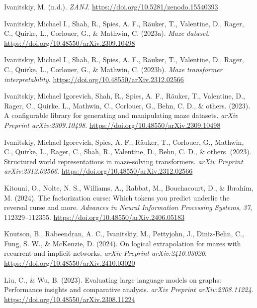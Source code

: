 \documentclass[10pt,a4paper,onecolumn]{article}
\newlength{\cslhangindent}
\newenvironment{CSLReferences}[2] %
 {\begin{list}{}{%
  \setlength{\itemindent}{0pt}
  \setlength{\leftmargin}{0pt}
  \setlength{\parsep}{0pt}
  \ifodd #1
   \setlength{\leftmargin}{\cslhangindent}
   \setlength{\itemindent}{-1\cslhangindent}
  \fi
  \setlength{\itemsep}{#2\baselineskip}}}
 {\end{list}}
\begin{document}
\begin{CSLReferences}{1}{0.5}
\leavevmode{}%
Ivanitskiy, M. (n.d.). \emph{ZANJ}.
\url{https://doi.org/10.5281/zenodo.15540393}

\leavevmode{}%
Ivanitskiy, Michael I., Shah, R., Spies, A. F., Räuker, T., Valentine,
D., Rager, C., Quirke, L., Corlouer, G., \& Mathwin, C. (2023a).
\emph{Maze dataset}. \url{https://doi.org/10.48550/arXiv.2309.10498}

\leavevmode{}%
Ivanitskiy, Michael I., Shah, R., Spies, A. F., Räuker, T., Valentine,
D., Rager, C., Quirke, L., Corlouer, G., \& Mathwin, C. (2023b).
\emph{Maze transformer interpretability}.
\url{https://doi.org/10.48550/arXiv.2312.02566}

\leavevmode{}%
Ivanitskiy, Michael Igorevich, Shah, R., Spies, A. F., Räuker, T.,
Valentine, D., Rager, C., Quirke, L., Mathwin, C., Corlouer, G., Behn,
C. D., \& others. (2023). A configurable library for generating and
manipulating maze datasets. \emph{arXiv Preprint arXiv:2309.10498}.
\url{https://doi.org/10.48550/arXiv.2309.10498}

\leavevmode{}%
Ivanitskiy, Michael Igorevich, Spies, A. F., Räuker, T., Corlouer, G.,
Mathwin, C., Quirke, L., Rager, C., Shah, R., Valentine, D., Behn, C.
D., \& others. (2023). Structured world representations in maze-solving
transformers. \emph{arXiv Preprint arXiv:2312.02566}.
\url{https://doi.org/10.48550/arXiv.2312.02566}

\leavevmode{}%
Kitouni, O., Nolte, N. S., Williams, A., Rabbat, M., Bouchacourt, D., \&
Ibrahim, M. (2024). The factorization curse: Which tokens you predict
underlie the reversal curse and more. \emph{Advances in Neural
Information Processing Systems}, \emph{37}, 112329--112355.
\url{https://doi.org/10.48550/arXiv.2406.05183}

\leavevmode{}%
Knutson, B., Rabeendran, A. C., Ivanitskiy, M., Pettyjohn, J.,
Diniz-Behn, C., Fung, S. W., \& McKenzie, D. (2024). On logical
extrapolation for mazes with recurrent and implicit networks.
\emph{arXiv Preprint arXiv:2410.03020}.
\url{https://doi.org/10.48550/arXiv.2410.03020}

\leavevmode{}%
Liu, C., \& Wu, B. (2023). Evaluating large language models on graphs:
Performance insights and comparative analysis. \emph{arXiv Preprint
arXiv:2308.11224}. \url{https://doi.org/10.48550/arXiv.2308.11224}


\end{CSLReferences}
\end{document}
